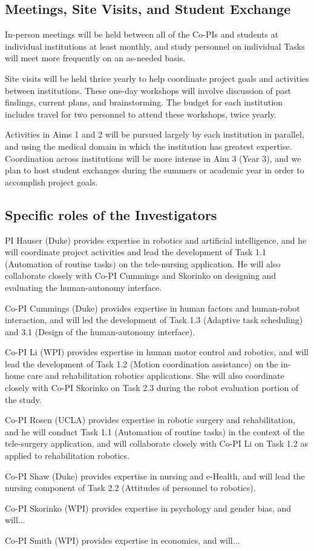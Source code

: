 \subsection{Meetings, Site Visits, and Student Exchange}

In-person meetings will be held between all of the Co-PIs and students at individual institutions at least monthly, and study personnel on individual Tasks will meet more frequently on an as-needed basis. 

Site visits will be held thrice yearly to help coordinate project goals and activities between institutions. These one-day workshops will involve discussion of past findings, current plans, and brainstorming. The budget for each institution includes travel for two personnel to attend these workshops, twice yearly. 

Activities in Aims 1 and 2 will be pursued largely by each institution in parallel, and using the medical domain in which the institution has greatest expertise. Coordination across institutions will be more intense in Aim 3 (Year 3), and we plan to host student exchanges during the summers or academic year in order to accomplish project goals.

\subsection{Specific roles of the Investigators}

PI Hauser (Duke) provides expertise in robotics and artificial intelligence, and he will coordinate project activities and lead the development of Task 1.1 (Automation of routine tasks) on the tele-nursing application.  He will also collaborate closely with Co-PI Cummings and Skorinko on designing and evaluating the human-autonomy interface.

Co-PI Cummings (Duke) provides expertise in human factors and human-robot interaction, and will led the development of Task 1.3 (Adaptive task scheduling) and 3.1 (Design of the human-autonomy interface).

Co-PI Li (WPI) provides expertise in human motor control and robotics, and will lead the development of Task 1.2 (Motion coordination assistance) on the in-home care and rehabilitation robotics applications.  She will also coordinate closely with Co-PI Skorinko on Task 2.3 during the robot evaluation portion of the study.

Co-PI Rosen (UCLA) provides expertise in robotic surgery and rehabilitation, and he will conduct Task 1.1 (Automation of routine tasks) in the context of the tele-surgery application, and will collaborate closely with Co-PI Li on Task 1.2 as applied to rehabilitation robotics.  

Co-PI Shaw (Duke) provides expertise in nursing and e-Health, and will lead the nursing component of Task 2.2 (Attitudes of personnel to robotics).

Co-PI Skorinko (WPI) provides expertise in psychology and gender bias, and will...

Co-PI Smith (WPI) provides expertise in economics, and will...
